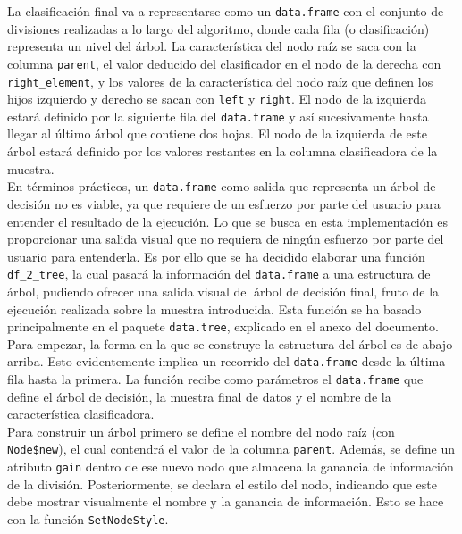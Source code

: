 \documentclass[12pt]{report}\usepackage[]{graphicx}\usepackage[dvipsnames]{xcolor}
\begin{document}
 			La clasificación final va a representarse como un \texttt{data.frame} con el conjunto de divisiones realizadas a lo largo del algoritmo, donde cada fila (o clasificación) representa un nivel del árbol. La característica del nodo raíz se saca con la columna \texttt{parent}, el valor deducido del clasificador en el nodo de la derecha con \texttt{right\_element}, y los valores de la característica del nodo raíz que definen los hijos izquierdo y derecho se sacan con \texttt{left} y \texttt{right}. El nodo de la izquierda estará definido por la siguiente fila del \texttt{data.frame} y así sucesivamente hasta llegar al último árbol que contiene dos hojas. El nodo de la izquierda de este árbol estará definido por los valores restantes en la columna clasificadora de la muestra.\\
 			
 			En términos prácticos, un \texttt{data.frame} como salida que representa un árbol de decisión no es viable, ya que requiere de un esfuerzo por parte del usuario para entender el resultado de la ejecución. Lo que se busca en esta implementación es proporcionar una salida visual que no requiera de ningún esfuerzo por parte del usuario para entenderla. Es por ello que se ha decidido elaborar una función \texttt{df\_2\_tree}, la cual pasará la información del \texttt{data.frame} a una estructura de árbol, pudiendo ofrecer una salida visual del árbol de decisión final, fruto de la ejecución realizada sobre la muestra introducida. Esta función se ha basado principalmente en el paquete \texttt{data.tree}, explicado en el anexo del documento.\\
 			
 			Para empezar, la forma en la que se construye la estructura del árbol es de abajo arriba. Esto evidentemente implica un recorrido del \texttt{data.frame} desde la última fila hasta la primera. La función recibe como parámetros el \texttt{data.frame} que define el árbol de decisión, la muestra final de datos y el nombre de la característica clasificadora.\\
 			
 			Para construir un árbol primero se define el nombre del nodo raíz (con \texttt{Node\$new}), el cual contendrá el valor de la columna \texttt{parent}. Además, se define un atributo \texttt{gain} dentro de ese nuevo nodo que almacena la ganancia de información de la división. Posteriormente, se declara el estilo del nodo, indicando que este debe mostrar visualmente el nombre y la ganancia de información. Esto se hace con la función \texttt{SetNodeStyle}.\\
 			
\end{document}
